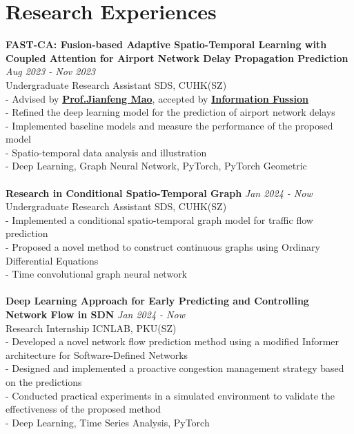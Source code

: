 \documentclass[a4paper,10pt]{article}
\begin{document}
\section*{Research Experiences}
\textbf{FAST-CA: Fusion-based Adaptive Spatio-Temporal Learning with Coupled Attention for Airport Network Delay Propagation Prediction} \hfill \textit{Aug 2023 - Nov 2023}\\
Undergraduate Research Assistant \hfill SDS, CUHK(SZ)\\
- Advised by \textbf{\href{https://sds.cuhk.edu.cn/en/teacher/268}{Prof.\@ Jianfeng Mao}}, accepted by  \textbf{\href{https://www.sciencedirect.com/science/article/pii/S1566253524001040}{Information Fussion}}\\
- Refined the deep learning model for the prediction of airport network delays\\
- Implemented baseline models and measure the performance of the proposed model\\
- Spatio-temporal data analysis and illustration\\
- Deep Learning, Graph Neural Network, PyTorch, PyTorch Geometric\\
\\
\textbf{Research in Conditional Spatio-Temporal Graph} \hfill \textit{Jan 2024 - Now}\\
Undergraduate Research Assistant \hfill SDS, CUHK(SZ)\\
- Implemented a conditional spatio-temporal graph model for traffic flow prediction\\
- Proposed a novel method to construct continuous graphs using Ordinary Differential Equations\\
- Time convolutional graph neural network\\
\\
\textbf{Deep Learning Approach for Early Predicting and Controlling Network Flow in SDN} \hfill \textit{Jan 2024 - Now}\\
Research Internship \hfill ICNLAB, PKU(SZ)\\
- Developed a novel network flow prediction method using a modified Informer architecture for Software-Defined Networks\\
- Designed and implemented a proactive congestion management strategy based on the predictions\\
- Conducted practical experiments in a simulated environment to validate the effectiveness of the proposed method\\
- Deep Learning, Time Series Analysis, PyTorch\\
\end{document}
